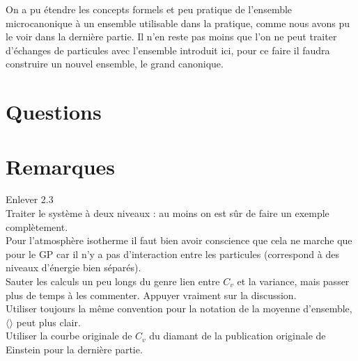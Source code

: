 \documentclass[12pt,prb,aps,epsf]{article}
\begin{document}
On a pu étendre les concepts formels et peu pratique de l'ensemble microcanonique à un ensemble utilisable dans la pratique, comme nous avons pu le voir dans la dernière partie. Il n'en reste pas moins que l'on ne peut traiter d'échanges de particules avec l'ensemble introduit ici, pour ce faire il faudra construire un nouvel ensemble, le grand canonique.

\section*{Questions}

\section*{Remarques}
Enlever 2.3\\
Traiter le système à deux niveaux : au moins on est sûr de faire un exemple complètement.\\
Pour l'atmosphère isotherme il faut bien avoir conscience que cela ne marche que pour le GP car il n'y a pas d'interaction entre les particules (correspond à des niveaux d'énergie bien séparés).\\
Sauter les calculs un peu longs du genre lien entre $C_v$ et la variance, mais passer plus de temps à les commenter. Appuyer vraiment sur la discussion.\\
Utiliser toujours la même convention pour la notation de la moyenne d'ensemble, $\langle \rangle$ peut plus clair.\\
Utiliser la courbe originale de $C_v$ du diamant de la publication originale de Einstein pour la dernière partie.
\end{document}
